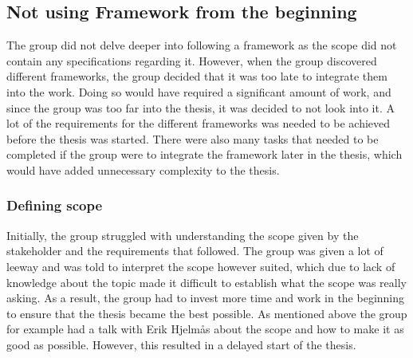 \subsection{Not using Framework from the beginning}
The group did not delve deeper into following a framework as the scope did not contain any specifications regarding it. However, when the group discovered different frameworks, the group decided that it was too late to integrate them into the work. Doing so would have required a significant amount of work, and since the group was too far into the thesis, it was decided to not look into it. A lot of the requirements for the different frameworks was needed to be achieved before the thesis was started. There were also many tasks that needed to be completed if the group were to integrate the framework later in the thesis, which would have added unnecessary complexity to the thesis. 

\subsubsection{Defining scope}
Initially, the group struggled with understanding the scope given by the stakeholder and the requirements that followed. The group was given a lot of leeway and was told to interpret the scope however suited, which due to lack of knowledge about the topic made it difficult to establish what the scope was really asking. As a result, the group had to invest more time and work in the beginning to ensure that the thesis became the best possible. As mentioned above the group for example had a talk with Erik Hjelmås about the scope and how to make it as good as possible. However, this resulted in a delayed start of the thesis. 


